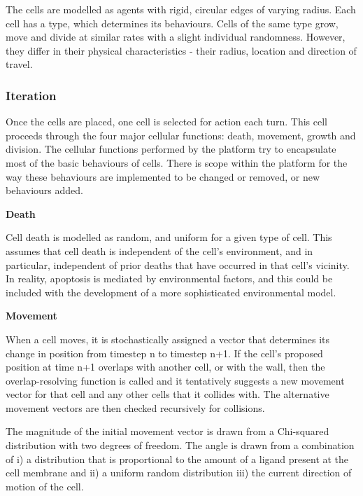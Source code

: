 \documentclass[12pt,a4paper]{report}
\begin{document}
The cells are modelled as agents with rigid, circular edges of varying 
radius. Each cell has a type, which determines its behaviours. Cells of 
the same type grow, move and divide at similar rates with a slight 
individual randomness. However, they differ in their physical 
characteristics - their radius, location and direction of travel.



\subsubsection{Iteration}
Once the cells are placed, one cell is selected for action each turn. 
This cell proceeds through the four major cellular functions: death, 
movement, growth and division. The cellular functions performed by the 
platform try to encapsulate most of the basic behaviours of cells. There 
is scope within the platform for the way these behaviours are 
implemented to be changed or removed, or new behaviours added.



{\bfseries Death}

Cell death is modelled as random, and uniform for a given type of cell. 
This assumes that cell death is independent of the cell's environment, 
and in particular, independent of prior deaths that have occurred in 
that cell's vicinity. In reality, apoptosis is mediated by environmental 
factors, and this could be included with the development of a more 
sophisticated environmental model.



{\bfseries Movement}

When a cell moves, it is stochastically assigned a vector that 
determines its change in position from timestep n to timestep n+1. If 
the cell's proposed position at time n+1 overlaps with another cell, or 
with the wall, then the overlap-resolving function is called and it 
tentatively suggests a new movement vector for that cell and any other 
cells that it collides with. The alternative movement vectors are then 
checked recursively for collisions.



The magnitude of the initial movement vector is drawn from a Chi-squared 
distribution with two degrees of freedom. The angle is drawn from a 
combination of i) a distribution that is proportional to the amount of a 
ligand present at the cell membrane and ii) a uniform random 
distribution iii) the current direction of motion of the cell.
\end{document}
